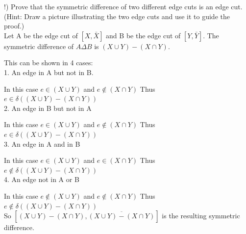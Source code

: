 \documentclass[12pt]{article}
\newenvironment{question}[2][Question]{\begin{trivlist}
\item[\hskip \labelsep {\bfseries #1}\hskip \labelsep {\bfseries #2.}]}{\end{trivlist}}
\begin{document}
\begin{question}{3}

($!$) Prove that the symmetric difference of two different edge cuts is an edge cut. (Hint: Draw a picture illustrating the two edge cuts and use it to guide the proof.) \\

Let A be the edge cut of  $[X,\bar{X}]$ and B be the edge cut of $[Y,\bar{Y}]$. The symmetric difference of $A \Delta B$ is $(X \cup Y) - (X \cap Y)$. 

This can be shown in 4 cases: \\
1. An edge in A but not in B.

	In this case $e \in (X \cup Y)$ and $e \notin (X \cap Y)$ Thus $e \in \delta((X \cup Y) - (X \cap Y))$\\	
2. An edge in B but not in A

	In this case $e \in (X \cup Y)$ and $e \notin (X \cap Y)$ Thus $e \in \delta((X \cup Y) - (X \cap Y))$\\	
3. An edge in A and in B

	In this case $e \in (X \cup Y)$ and $e \in (X \cap Y)$ Thus $e \notin \delta((X \cup Y) - (X \cap Y))$\\	
4. An edge not in A or B

	In this case $e \notin (X \cup Y)$ and $e \notin (X \cap Y)$ Thus $e \notin \delta((X \cup Y) - (X \cap Y))$\\	
	
So $[(X \cup Y) - (X \cap Y), \overline{(X \cup Y) - (X \cap Y)}]$ is the resulting symmetric difference.

	\\
\end{question}
\end{document}
